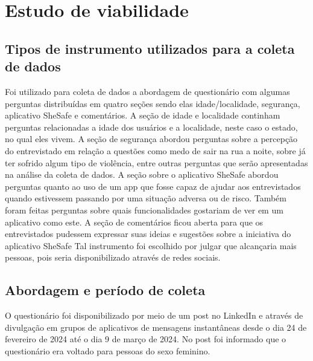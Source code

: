 \chapter{Estudo de viabilidade}\label{sec:EstuViab}

\section{Tipos de instrumento utilizados para a coleta de dados}
Foi utilizado para coleta de dados a abordagem de questionário com algumas perguntas distribuídas em quatro seções sendo elas idade/localidade, segurança, aplicativo SheSafe e comentários. 
A seção de idade e localidade continham perguntas relacionadas a idade dos usuários e a localidade, neste caso o estado, no qual eles vivem.
A seção de segurança abordou perguntas sobre a percepção do entrevistado em relação a questões como medo de sair na rua a noite, sobre já ter sofrido algum tipo de violência, entre outras perguntas que serão apresentadas na análise da coleta de dados.
A seção sobre o aplicativo SheSafe abordou perguntas quanto ao uso de um app que fosse capaz de ajudar aos entrevistados quando estivessem passando por uma situação adversa ou de risco. Também foram feitas perguntas sobre quais funcionalidades gostariam de ver em um aplicativo como este.
A seção de comentários ficou aberta para que os entrevistados pudessem expressar suas ideias e sugestões sobre a iniciativa do aplicativo SheSafe
Tal instrumento foi escolhido por julgar que alcançaria mais pessoas, pois seria disponibilizado através de redes sociais.

\section{Abordagem e período de coleta}
O questionário foi disponibilizado por meio de um post no LinkedIn e através de divulgação em grupos de aplicativos de mensagens instantâneas desde o dia 24 de fevereiro de 2024 até o dia 9 de março de 2024. No post foi informado que o questionário era voltado para pessoas do sexo feminino.

